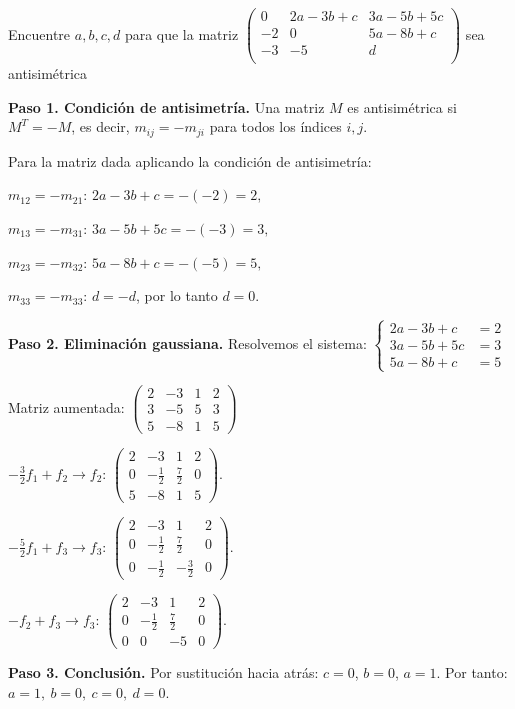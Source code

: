 \begin{prob}
Encuentre $a,b,c,d$ para que la matriz $\left( \begin{array}{ccc}
0&2a-3b+c&3a-5b+5c\\
-2&0&5a-8b+c\\
-3&-5&d\\\end{array} \right)$ sea antisimétrica 

\begin{myproof}
\textbf{Paso 1. Condición de antisimetría.} Una matriz $M$ es antisimétrica si $M^T = -M$, es decir, $m_{ij} = -m_{ji}$ para todos los índices $i,j$.

Para la matriz dada aplicando la condición de antisimetría:

$m_{12} = -m_{21}$: $2a-3b+c = -(-2) = 2,$

$m_{13} = -m_{31}$: $3a-5b+5c = -(-3) = 3,$

$m_{23} = -m_{32}$: $5a-8b+c = -(-5) = 5,$

$m_{33} = -m_{33}$: $d = -d$, por lo tanto $d = 0$.

\textbf{Paso 2. Eliminación gaussiana.} Resolvemos el sistema: $\begin{cases}
2a-3b+c &= 2 \\
3a-5b+5c &= 3 \\
5a-8b+c &= 5
\end{cases}$

Matriz aumentada: $\left(\begin{array}{ccc|c}
2 & -3 & 1 & 2 \\
3 & -5 & 5 & 3 \\
5 & -8 & 1 & 5
\end{array}\right)$

$-\frac{3}{2}f_1 + f_2 \to f_2$: $\left(\begin{array}{ccc|c}
2 & -3 & 1 & 2 \\
0 & -\frac{1}{2} & \frac{7}{2} & 0 \\
5 & -8 & 1 & 5
\end{array}\right).$

$-\frac{5}{2}f_1 + f_3 \to f_3$: $\left(\begin{array}{ccc|c}
2 & -3 & 1 & 2 \\
0 & -\frac{1}{2} & \frac{7}{2} & 0 \\
0 & -\frac{1}{2} & -\frac{3}{2} & 0
\end{array}\right).$

$-f_2 + f_3 \to f_3$: $\left(\begin{array}{ccc|c}
2 & -3 & 1 & 2 \\
0 & -\frac{1}{2} & \frac{7}{2} & 0 \\
0 & 0 & -5 & 0
\end{array}\right).$

\textbf{Paso 3. Conclusión.} Por sustitución hacia atrás:
$c = 0$, $b = 0$, $a = 1$. Por tanto: $\boxed{a = 1,\ b = 0,\ c = 0,\ d = 0}.$
\end{myproof}
\end{prob}

